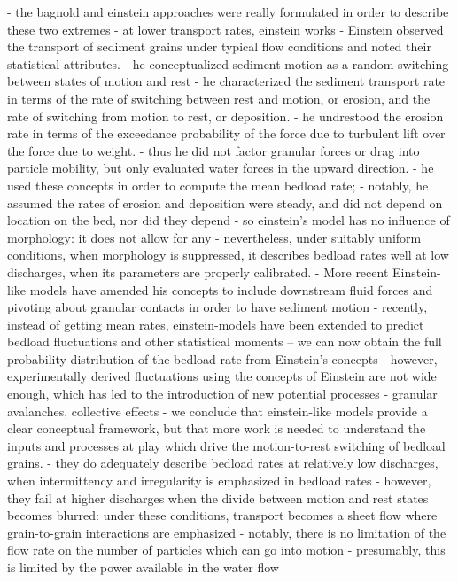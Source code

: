 \documentclass{article}
\begin{document}
{- the bagnold and einstein approaches were really formulated in order to describe these two extremes
- at lower transport rates, einstein works 
- Einstein observed the transport of sediment grains under typical flow conditions and noted their statistical attributes. 
- he conceptualized sediment motion as a random switching between states of motion and rest
- he characterized the sediment transport rate in terms of the rate of switching between rest and motion, or erosion, and the rate of switching from motion to rest, or deposition. 
- he undrestood the erosion rate in terms of the exceedance probability of the force due to turbulent lift over the force due to weight. 
- thus he did not factor granular forces or drag into particle mobility, but only evaluated water forces in the upward direction. 
- he used these concepts in order to compute the mean bedload rate; 
- notably, he assumed the rates of erosion and deposition were steady, and did not depend on location on the bed, nor did they depend 
- so einstein's model has no influence of morphology: it does not allow for any 
- nevertheless, under suitably uniform conditions, when morphology is suppressed, it describes bedload rates well at low discharges, when its parameters are properly calibrated. 
- More recent Einstein-like models have amended his concepts to include downstream fluid forces and pivoting about granular contacts in order to have sediment motion
- recently, instead of getting mean rates, einstein-models have been extended to predict bedload fluctuations and other statistical moments -- we can now obtain the full probability distribution of the bedload rate from Einstein's concepts
- however, experimentally derived fluctuations using the concepts of Einstein are not wide enough, which has led to the introduction of new potential processes
- granular avalanches, collective effects
- we conclude that einstein-like models provide a clear conceptual framework, but that more work is needed to understand the inputs and processes at play which drive the motion-to-rest switching of bedload grains. 
- they do adequately describe bedload rates at relatively low discharges, when intermittency and irregularity is emphasized in bedload rates
- however, they fail at higher discharges when the divide between motion and rest states becomes blurred: under these conditions, transport becomes a sheet flow where grain-to-grain interactions are emphasized
- notably, there is no limitation of the flow rate on the number of particles which can go into motion
- presumably, this is limited by the power available in the water flow 

}
\end{document}
